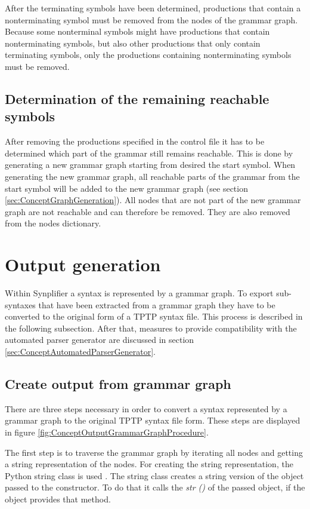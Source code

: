 After the terminating symbols have been determined, productions that contain a nonterminating symbol must be removed from the nodes of the grammar graph. Because some nonterminal symbols might have productions that contain nonterminating symbols, but also other productions that only contain terminating symbols, only the productions containing nonterminating symbols must be removed.

\subsection{Determination of the remaining reachable symbols}\label{sec:ConceptDerterminingRemainingReachable}

After removing the productions specified in the control file it has to be determined which part of the grammar still remains reachable.
This is done by generating a new grammar graph starting from desired the start symbol.
When generating the new grammar graph, all reachable parts of the grammar from the start symbol will be added to the new grammar graph (see section \ref{sec:ConceptGraphGeneration}).
All nodes that are not part of the new grammar graph are not reachable and can therefore be removed. They are also removed from the nodes dictionary.

\section{Output generation}\label{sec:ConceptOutputGeneration}

Within \ac{Synplifier} a syntax is represented by a grammar graph.
To export sub-syntaxes that have been extracted from a grammar graph they have to be converted to the original form of a \ac{TPTP} syntax file. This process is described in the following subsection.
After that, measures to provide compatibility with the automated parser generator are discussed in section \ref{sec:ConceptAutomatedParserGenerator}.

\subsection{Create output from grammar graph}\label{sec:ConceptOutputGrammarGraph}

There are three steps necessary in order to convert a syntax represented by a grammar graph to the original \ac{TPTP} syntax file form. These steps are displayed in figure \ref{fig:ConceptOutputGrammarGraphProcedure}.

The first step is to traverse the grammar graph by iterating all nodes and getting a string representation of the nodes.
For creating the string representation, the Python string class is used \cite{StringClass}. The string class creates a string version of the object passed to the constructor.
To do that it calls the \textit{\textunderscore \textunderscore str \textunderscore \textunderscore ()} of the passed object, if the object provides that method.


